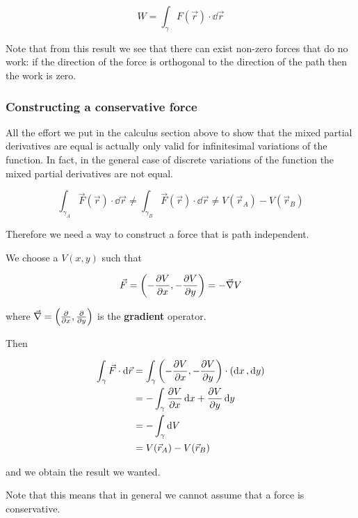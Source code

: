 \documentclass[10pt]{extarticle}
\begin{document}
$$
    W = \int_{\gamma} F(\vec{r}) \cdot \dd{\vec{r}}
$$

Note that from this result we see that there can exist non-zero forces that do no work:
if the direction of the force is orthogonal to the direction of the path then the work is zero.

\subsubsection{Constructing a conservative force}

All the effort we put in the calculus section above to show that the mixed partial derivatives are equal is actually only valid for infinitesimal variations of the function.
In fact, in the general case of discrete variations of the function the mixed partial derivatives are not equal.

$$
    \int_{\gamma_A} \vec{F}(\vec{r}) \cdot \dd \vec{r} \neq \int_{\gamma_B} \vec{F}(\vec{r}) \cdot \dd \vec{r} \ne V(\vec{r}_A) - V(\vec{r}_B)
$$

Therefore we need a way to construct a force that is path independent.

We choose a $V(x, y)$ such that

$$
    \vec{F} = \left( - \pdv{V}{x}, - \pdv{V}{y} \right) = -\vec{\nabla} V
$$

where $\vec{\nabla} = \left( \pdv{x}, \pdv{y} \right)$ is the \textbf{gradient} operator.

Then

\begin{align*}
    \int_\gamma \vec{F} \cdot \dd{\vec{r}} & = \int_\gamma \left( -\pdv{V}{x}, -\pdv{V}{y} \right) \cdot (\dd{x}, \dd{y}) \\
                                           & = - \int_\gamma \pdv{V}{x} \dd{x} + \pdv{V}{y} \dd{y}                        \\
                                           & = - \int_\gamma \dd{V}                                                       \\
                                           & = V(\vec{r}_A) - V(\vec{r}_B)
\end{align*}

and we obtain the result we wanted.

Note that this means that in general we cannot assume that a force is conservative.
\end{document}
